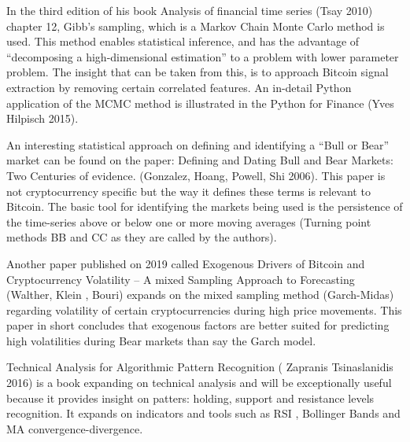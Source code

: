 In the third edition of his book Analysis of financial time series (Tsay 2010) chapter 12,
Gibb’s sampling, which is a Markov Chain Monte Carlo method is used. This method enables
statistical inference, and has the advantage of “decomposing a high-dimensional estimation” to
a problem with lower parameter problem. The insight that can be taken from this, is to
approach Bitcoin signal extraction by removing certain correlated features. An in-detail Python
application of the MCMC method is illustrated in the Python for Finance (Yves Hilpisch 2015).

An interesting statistical approach on defining and identifying a “Bull or Bear” market
can be found on the paper: Defining and Dating Bull and Bear Markets: Two Centuries of
evidence. (Gonzalez, Hoang, Powell, Shi 2006). This paper is not cryptocurrency specific but the
way it defines these terms is relevant to Bitcoin. The basic tool for identifying the markets being
used is the persistence of the time-series above or below one or more moving averages
(Turning point methods BB and CC as they are called by the authors).

Another paper published on 2019 called Exogenous Drivers of Bitcoin and
Cryptocurrency Volatility – A mixed Sampling Approach to Forecasting (Walther, Klein , Bouri)
expands on the mixed sampling method (Garch-Midas) regarding volatility of certain
cryptocurrencies during high price movements. This paper in short concludes that exogenous
factors are better suited for predicting high volatilities during Bear markets than say the Garch
model.

Technical Analysis for Algorithmic Pattern Recognition ( Zapranis Tsinaslanidis 2016) is a
book expanding on technical analysis and will be exceptionally useful because it provides insight
on patters: holding, support and resistance levels recognition. It expands on indicators and
tools such as RSI , Bollinger Bands and MA convergence-divergence.
